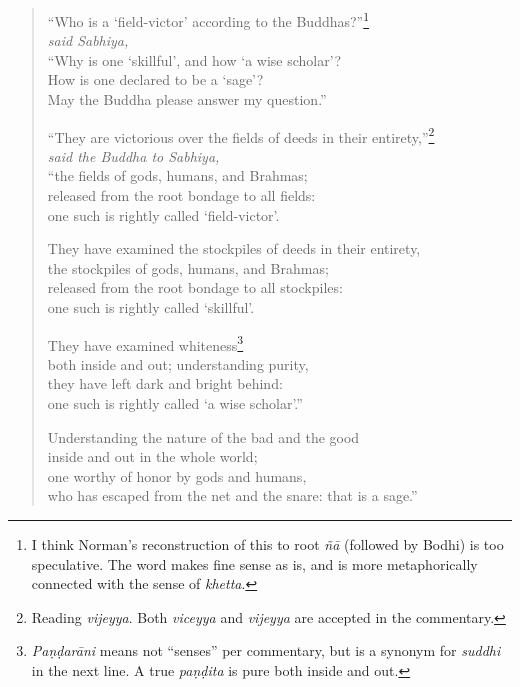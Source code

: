 \documentclass[12pt,openany]{book}%
\newcommand*{\scspeaker}[1]{\hspace{2em}\textit{#1}}
\begin{document}
\begin{verse}%
“Who is a ‘field-victor’ according to the Buddhas?”\footnote{I think Norman’s reconstruction of this to root \textit{\textsanskrit{ñā}} (followed by Bodhi) is too speculative. The word makes fine sense as is, and is more metaphorically connected with the sense of \textit{khetta}. } \\
\scspeaker{said Sabhiya, }\\
“Why is one ‘skillful’, and how ‘a wise scholar’? \\
How is one declared to be a ‘sage’? \\
May the Buddha please answer my question.” 

“They are victorious over the fields of deeds in their entirety,”\footnote{Reading \textit{vijeyya}. Both \textit{viceyya} and \textit{vijeyya} are accepted in the commentary. } \\
\scspeaker{said the Buddha to Sabhiya, }\\
“the fields of gods, humans, and Brahmas; \\
released from the root bondage to all fields: \\
one such is rightly called ‘field-victor’. 

They have examined the stockpiles of deeds in their entirety, \\
the stockpiles of gods, humans, and Brahmas; \\
released from the root bondage to all stockpiles: \\
one such is rightly called ‘skillful’. 

They have examined whiteness\footnote{\textit{\textsanskrit{Paṇḍarāni}} means not “senses” per commentary, but is a synonym for \textit{suddhi} in the next line. A true \textit{\textsanskrit{paṇḍita}} is pure both inside and out. } \\
both inside and out; understanding purity, \\
they have left dark and bright behind: \\
one such is rightly called ‘a wise scholar’.” 

Understanding the nature of the bad and the good \\
inside and out in the whole world; \\
one worthy of honor by gods and humans, \\
who has escaped from the net and the snare: that is a sage.” 

%
\end{verse}
\end{document}
